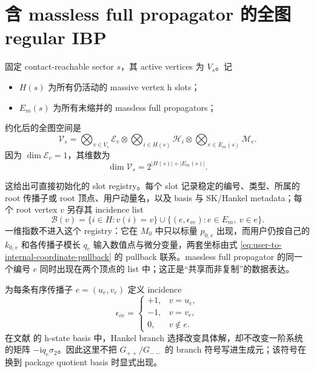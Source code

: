 \documentclass[11pt,a4paper]{ctexart}
\newcommand{\ii}{\mathrm i}
\newcommand{\cV}{\mathcal V}
\newcommand{\cE}{\mathcal E}
\newcommand{\cH}{\mathcal H}
\newcommand{\cM}{\mathcal M}
\newcommand{\cB}{\mathcal B}
\begin{document}
\section{含 massless full propagator 的全图 regular IBP}

固定 contact-reachable sector $s$，其 active vertices 为 $V_s$。记
\begin{itemize}
  \item $H(s)$ 为所有仍活动的 massive vertex h slots；
  \item $E_m(s)$ 为所有未缩并的 massless full propagators；
\end{itemize}
约化后的全图空间是
\begin{equation}
 \boxed{
 \cV_s
 =\bigotimes_{v\in V_s}\cE_v
 \otimes\bigotimes_{i\in H(s)}\cH_i
 \otimes\bigotimes_{e\in E_m(s)}\cM_e.
 }
 \label{eq:global-reduced-space}
\end{equation}
因为 $\dim\cE_v=1$，其维数为
\begin{equation}
 \dim\cV_s=2^{|H(s)|+|E_m(s)|}.
\end{equation}

这给出可直接初始化的 slot registry。每个 slot 记录稳定的编号、类型、所属的 root 传播子或 root 顶点、用户动量名，以及 basis 与 SK/Hankel metadata；每个 root vertex $v$ 另存其 incidence list
\begin{equation}
 \cB(v)=
 \{i\in H:v(i)=v\}
 \cup\{(e,\epsilon_{ve}):e\in E_m,\ v\in e\}.
 \label{eq:vertex-block-incidence}
\end{equation}
一维指数不进入这个 registry：它在 $M_0$ 中只以标量 $p_{0,v}$ 出现，而用户仍按自己的 $k_{0,v}$ 和各传播子模长 $q_e$ 输入数值点与微分变量，两套坐标由式 \eqref{eq:user-to-internal-coordinate-pullback} 的 pullback 联系。massless full propagator 的同一个编号 $e$ 同时出现在两个顶点的 list 中；这正是“共享而非复制”的数据表达。

为每条有序传播子 $e=(u_e,v_e)$ 定义 incidence
\begin{equation}
 \epsilon_{ve}=
 \begin{cases}
 +1,&v=u_e,\\
 -1,&v=v_e,\\
 0,&v\notin e.
 \end{cases}
\end{equation}
在文献 \cite{Chen:2023eic} 的 h-state basis 中，Hankel branch 选择改变具体解，却不改变一阶系统的矩阵 $-\ii q_e\sigma_2$。因此这里不把 $G_{++}/G_{--}$ 的 branch 符号写进生成元；该符号在换到 package quotient basis 时显式出现。
\end{document}
